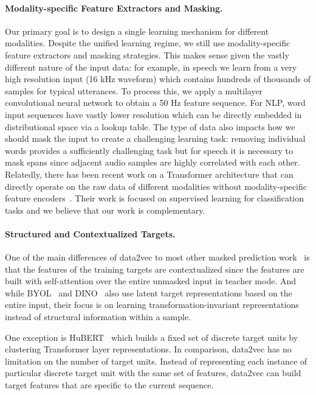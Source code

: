 \documentclass[nohyperref]{article}
\theoremstyle{plain}
\theoremstyle{definition}
\theoremstyle{remark}
\newcommand{\name}{data2vec}
\begin{document}
\paragraph{Modality-specific Feature Extractors and Masking.}
Our primary goal is to design a single learning mechanism for different modalities. 
Despite the unified learning regime, we still use modality-specific feature extractors and masking strategies.
This makes sense given the vastly different nature of the input data:
for example, in speech we learn from a very high resolution input (16 kHz waveform) which contains hundreds of thousands of samples for typical utterances. 
To process this, we apply a multilayer convolutional neural network to obtain a 50 Hz feature sequence.
For NLP, word input sequences have vastly lower resolution which can be directly embedded in distributional space via a lookup table.
The type of data also impacts how we should mask the input to create a challenging learning task:
removing individual words provides a sufficiently challenging task but for speech it is necessary to mask spans since adjacent audio samples are highly correlated with each other.
Relatedly, there has been recent work on a Transformer architecture that can directly operate on the raw data of different modalities without modality-specific feature encoders~\citep{jaegle2021perceiver,jaegle2022perceiverio}.
Their work is focused on supervised learning for classification tasks and we believe that our work is complementary. 


\paragraph{Structured and Contextualized Targets.}
One of the main differences of \name{} to most other masked prediction work~\citep{devlin2018bert,baevski2020wav,ling2020decoar,bao2021beit,he2021mae,wei2021masked} is that the features of the training targets are contextualized since the features are built with self-attention over the entire unmasked input in teacher mode.
And while BYOL~\citep{grill2020byol} and DINO~\citep{caron2021dino} also use latent target representations based on the entire input, their focus is on learning transformation-invariant representations instead of structural information within a sample.

One exception is HuBERT~\citep{hsu2020hubert} which builds a fixed set of discrete target units by clustering Transformer layer representations.
In comparison, \name{} has no limitation on the number of target units.
Instead of representing each instance of particular discrete target unit with the same set of features, \name{} can build target features that are specific to the current sequence.
\end{document}
